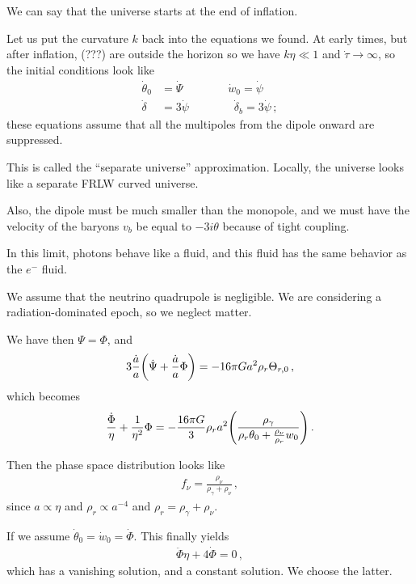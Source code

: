 \documentclass[main.tex]{subfiles}
\begin{document}
We can say that the universe starts at the end of inflation.

Let us put the curvature \(k\) back into the equations we found. 
At early times, but after inflation, (???) are outside the horizon
so we have \(k \eta \ll 1\) and \(\dot{\tau} \rightarrow \infty \), so the initial conditions look like 
%
\begin{subequations}
\begin{align}
\dot{\theta}_{0} &= \dot{\Psi} 
\qquad \qquad
\dot{w}_{0} = \dot{\psi} \\
\dot{\delta} &= 3 \dot{\psi}   
\qquad  \qquad
\dot{\delta}_{b} = 3 \dot{\psi}
\,;
\end{align}
\end{subequations}
%
these equations assume that all the multipoles from the dipole onward are suppressed. 

This is called the ``separate universe'' approximation. Locally, the universe looks like a separate FRLW curved universe.

Also, the dipole must be much smaller than the monopole, and we must have the velocity of the baryons \(v_b\) be equal to \(-3 i \theta \) because of tight coupling. 

In this limit, photons behave like a fluid, and this fluid has the same behavior as the \(e^{-}\) fluid.

We assume that the neutrino quadrupole is negligible. 
We are considering a radiation-dominated epoch, so we neglect matter. 

We have then \(\Psi = \Phi \), and 
%
\begin{align}
3 \frac{\dot{a}}{a} \qty(\dot{\Psi} + \frac{\dot{a}}{a} \Phi ) = - 16 \pi G a^2 \rho_{r} \Theta_{r, 0}
\,,
\end{align}
%
which becomes 
%
\begin{align}
\frac{\dot{\Phi}}{\eta } + \frac{1}{\eta^2} \Phi 
= - \frac{16 \pi G}{3} \rho_{r} a^2 \qty(\frac{\rho_{\gamma }}{\rho_{r} \theta_{0} + \frac{\rho_{\nu}}{\rho_{r}} w_0 })
\,.
\end{align}

Then the phase space distribution looks like 
%
\begin{align}
f_{\nu } = \frac{\rho_{\nu }}{\rho_{\gamma } + \rho_{\nu }}
\,,
\end{align}
%
since \(a \propto \eta \) and \(\rho_{r} \propto a^{-4} \) and \(\rho_{r} = \rho_{\gamma } + \rho_{\nu }\). 

If we assume \(\dot{\theta}_{0} = \dot{w}_{0} = \dot{\Phi}\). This finally yields 
%
\begin{align}
\ddot{\Phi} \eta + 4 \dot{\Phi} = 0
\,,
\end{align}
%
which has a vanishing solution, and a constant solution. We choose the latter. 
\end{document}
